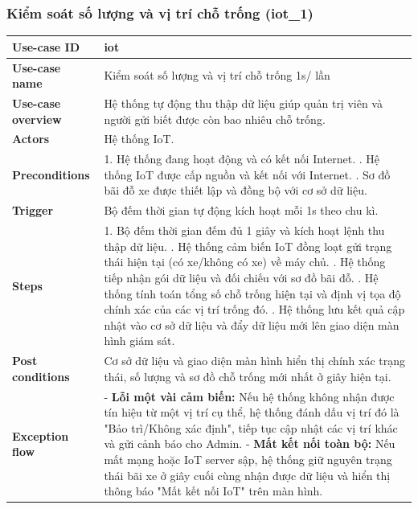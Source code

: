 \subsubsection{Kiểm soát số lượng và vị trí chỗ trống (iot\_1)}
\begingroup
\small
\begin{longtable}{|>{\centering\arraybackslash}m{3cm}|m{13.7cm}|}
\hline
\textbf{Use-case ID} & iot \\ \hline
\textbf{Use-case name} & Kiểm soát số lượng và vị trí chỗ trống 1s/ lần \\ \hline
\textbf{Use-case overview} & Hệ thống tự động thu thập dữ liệu giúp quản trị viên và người gửi biết được còn bao nhiêu chỗ trống. \\ \hline
\textbf{Actors} & Hệ thống IoT. \\ \hline
\textbf{Preconditions} & 
1. Hệ thống đang hoạt động và có kết nối Internet. \newline
2. Hệ thống IoT được cấp nguồn và kết nối với Internet. \newline
3. Sơ đồ bãi đỗ xe được thiết lập và đồng bộ với cơ sở dữ liệu. \\ \hline
\textbf{Trigger} & Bộ đếm thời gian tự động kích hoạt mỗi 1s theo chu kì. \\ \hline
\textbf{Steps} & 
1. Bộ đếm thời gian đếm đủ 1 giây và kích hoạt lệnh thu thập dữ liệu. \newline
2. Hệ thống cảm biến IoT đồng loạt gửi trạng thái hiện tại (có xe/không có xe) về máy chủ. \newline
3. Hệ thống tiếp nhận gói dữ liệu và đối chiếu với sơ đồ bãi đỗ. \newline
4. Hệ thống tính toán tổng số chỗ trống hiện tại và định vị tọa độ chính xác của các vị trí trống đó. \newline
5. Hệ thống lưu kết quả cập nhật vào cơ sở dữ liệu và đẩy dữ liệu mới lên giao diện màn hình giám sát. \\ \hline
\textbf{Post conditions} & Cơ sở dữ liệu và giao diện màn hình hiển thị chính xác trạng thái, số lượng và sơ đồ chỗ trống mới nhất ở giây hiện tại.\\ \hline
\textbf{Exception flow} & - \textbf{Lỗi một vài cảm biến:} Nếu hệ thống không nhận được tín hiệu từ một vị trí cụ thể, hệ thống đánh dấu vị trí đó là "Bảo trì/Không xác định", tiếp tục cập nhật các vị trí khác và gửi cảnh báo cho Admin.\newline
- \textbf{Mất kết nối toàn bộ:} Nếu mất mạng hoặc IoT server sập, hệ thống giữ nguyên trạng thái bãi xe ở giây cuối cùng nhận được dữ liệu và hiển thị thông báo "Mất kết nối IoT" trên màn hình. \\ \hline
\end{longtable}
\endgroup

